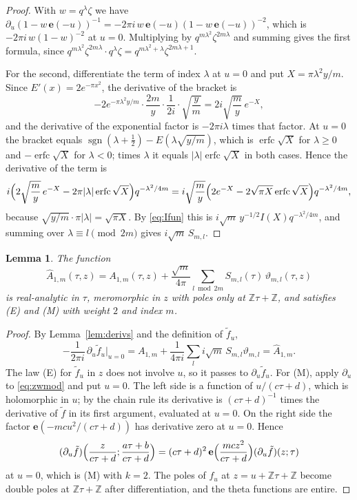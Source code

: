 \documentclass[11pt]{amsart}
\newtheorem{lemma}[theorem]{Lemma}
\theoremstyle{definition}
\newcommand{\ZZ}{\mathbb{Z}}
\newcommand{\vt}{\vartheta}
\newcommand{\Ah}{\widehat{A}}
\newcommand{\erfc}{\operatorname{erfc}}
\newcommand{\e}{\mathbf{e}}
\begin{document}
\begin{proof}
With $w=q^\lambda\zeta$ we have $\partial_u(1-w\,\e(-u))^{-1}=-2\pi i\,w\,\e(-u)(1-w\,\e(-u))^{-2}$, which is $-2\pi i\,w(1-w)^{-2}$ at $u=0$. Multiplying by $q^{m\lambda^2}\zeta^{2m\lambda}$ and summing gives the first formula, since $q^{m\lambda^2}\zeta^{2m\lambda}\cdot q^\lambda\zeta=q^{m\lambda^2+\lambda}\zeta^{2m\lambda+1}$.

For the second, differentiate the term of index $\lambda$ at $u=0$ and put $X=\pi\lambda^2y/m$. Since $E'(x)=2e^{-\pi x^2}$, the derivative of the bracket is
\[
-2e^{-\pi\lambda^2y/m}\cdot\frac{2m}{y}\cdot\frac1{2i}\cdot\sqrt{\frac ym}=2i\sqrt{\frac my}\,e^{-X},
\]
and the derivative of the exponential factor is $-2\pi i\lambda$ times that factor. At $u=0$ the bracket equals $\operatorname{sgn}(\lambda+\frac12)-E(\lambda\sqrt{y/m})$, which is $\erfc\sqrt X$ for $\lambda\ge0$ and $-\erfc\sqrt X$ for $\lambda<0$; times $\lambda$ it equals $|\lambda|\erfc\sqrt X$ in both cases. Hence the derivative of the term is
\[
i\Bigl(2\sqrt{\frac my}\,e^{-X}-2\pi|\lambda|\erfc\sqrt X\Bigr)q^{-\lambda^2/4m}=i\sqrt{\frac my}\Bigl(2e^{-X}-2\sqrt{\pi X}\erfc\sqrt X\Bigr)q^{-\lambda^2/4m},
\]
because $\sqrt{y/m}\cdot\pi|\lambda|=\sqrt{\pi X}$. By \eqref{eq:Ifun} this is $i\sqrt m\,y^{-1/2}I(X)q^{-\lambda^2/4m}$, and summing over $\lambda\equiv l\pmod{2m}$ gives $i\sqrt m\,S_{m,l}$.
\end{proof}

\begin{lemma}\label{lem:Ahat}
The function
\[
\Ah_{1,m}(\tau,z)=A_{1,m}(\tau,z)+\frac{\sqrt m}{4\pi}\sum_{l\bmod 2m}S_{m,l}(\tau)\,\vt_{m,l}(\tau,z)
\]
is real-analytic in $\tau$, meromorphic in $z$ with poles only at $\ZZ\tau+\ZZ$, and satisfies \textup{(E)} and \textup{(M)} with weight $2$ and index $m$.
\end{lemma}

\begin{proof}
By Lemma~\ref{lem:derivs} and the definition of $\tilde f_u$,
\[
-\frac1{2\pi i}\,\partial_u\tilde f_u\big|_{u=0}=A_{1,m}+\frac{1}{4\pi i}\sum_{l}i\sqrt m\,S_{m,l}\vt_{m,l}=\Ah_{1,m}.
\]
The law (E) for $\tilde f_u$ in $z$ does not involve $u$, so it passes to $\partial_u\tilde f_u$. For (M), apply $\partial_u$ to \eqref{eq:zwmod} and put $u=0$. The left side is a function of $u/(c\tau+d)$, which is holomorphic in $u$; by the chain rule its derivative is $(c\tau+d)^{-1}$ times the derivative of $\tilde f$ in its first argument, evaluated at $u=0$. On the right side the factor $\e(-mcu^2/(c\tau+d))$ has derivative zero at $u=0$. Hence
\[
(\partial_u\tilde f)\Bigl(\frac{z}{c\tau+d};\frac{a\tau+b}{c\tau+d}\Bigr)=(c\tau+d)^2\,\e\Bigl(\frac{mcz^2}{c\tau+d}\Bigr)(\partial_u\tilde f)(z;\tau)
\]
at $u=0$, which is (M) with $k=2$. The poles of $f_u$ at $z=u+\ZZ\tau+\ZZ$ become double poles at $\ZZ\tau+\ZZ$ after differentiation, and the theta functions are entire.
\end{proof}
\end{document}
